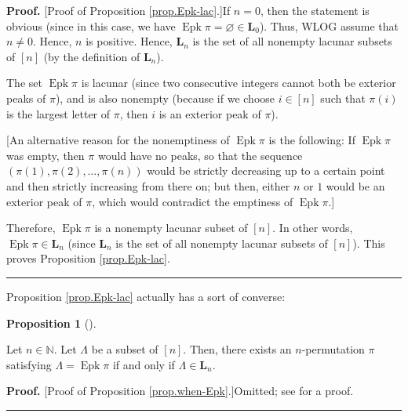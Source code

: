 \documentclass[numbers=enddot,12pt,final,onecolumn,notitlepage]{scrartcl}%
\theoremstyle{definition}
\newtheorem{prop}[theo]{Proposition}
\newenvironment{proposition}[1][]
{\begin{prop}[#1]\begin{leftbar}}
{\end{leftbar}\end{prop}}
\newenvironment{proof}[1][Proof]{\noindent\textbf{#1.} }{\ \rule{0.5em}{0.5em}}
\newenvironment{verlong}{}{}
\newenvironment{vershort}{}{}
\begin{document}
\begin{proof}
[Proof of Proposition \ref{prop.Epk-lac}.]If $n=0$, then the statement is
obvious (since in this case, we have $\operatorname{Epk}\pi=\varnothing
\in\mathbf{L}_{0}$). Thus, WLOG assume that $n\neq0$. Hence, $n$ is positive.
Hence, $\mathbf{L}_{n}$ is the set of all nonempty lacunar subsets of $\left[
n\right]  $ (by the definition of $\mathbf{L}_{n}$).

The set $\operatorname{Epk}\pi$ is lacunar (since two consecutive integers
cannot both be exterior peaks of $\pi$), and is also nonempty (because
if we choose $i \in \left[n\right]$ such that $\pi\left(i\right)$ is the
largest letter of $\pi$, then $i$ is an exterior peak of $\pi$).
\begin{verlong}

[An alternative reason for the nonemptiness of $\operatorname{Epk}\pi$ is the
following: If $\operatorname{Epk}\pi$ was empty, then $\pi$ would have no
peaks, so that the sequence $\left(  \pi\left(  1\right)  ,\pi\left(
2\right)  ,\ldots,\pi\left(  n\right)  \right)  $ would be strictly decreasing
up to a certain point and then strictly increasing from there on; but then,
either $n$ or $1$ would be an exterior peak of $\pi$, which would contradict
the emptiness of $\operatorname{Epk}\pi$.]

\end{verlong}
Therefore, $\operatorname{Epk}\pi$ is a nonempty lacunar subset of
$\left[  n\right]  $. In other words, $\operatorname{Epk}\pi\in\mathbf{L}%
_{n}$ (since $\mathbf{L}_{n}$ is the set of all nonempty lacunar subsets of
$\left[  n\right]  $). This proves Proposition \ref{prop.Epk-lac}.
\end{proof}

Proposition \ref{prop.Epk-lac} actually has a sort of converse:

\begin{proposition}
\label{prop.when-Epk}Let $n\in\mathbb{N}$. Let $\Lambda$ be a subset of
$\left[  n\right]  $. Then, there exists an $n$-permutation $\pi$ satisfying
$\Lambda=\operatorname{Epk}\pi$ if and only if $\Lambda\in\mathbf{L}_{n}$.
\end{proposition}

\begin{vershort}
\begin{proof}
[Proof of Proposition \ref{prop.when-Epk}.]Omitted; see \cite{verlong} for a proof.
\end{proof}
\end{vershort}
\end{document}
